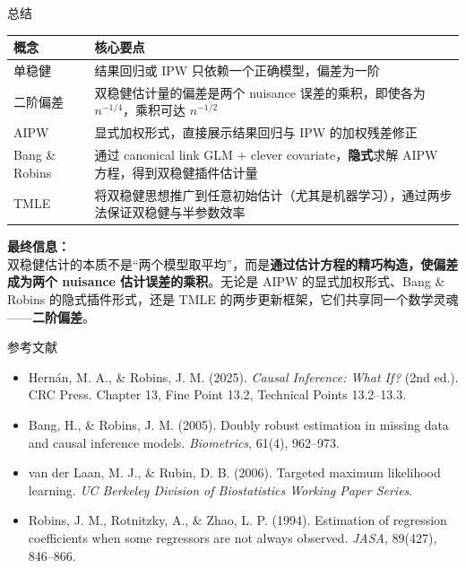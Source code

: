 \documentclass[aspectratio=169,10pt]{beamer}
\begin{document}
	\begin{frame}{总结}
		\begin{center}
			\begin{tabular}{p{3.5cm}p{9cm}}
				\toprule
				\textbf{概念} & \textbf{核心要点} \\
				\midrule
				单稳健 & 结果回归或 IPW 只依赖一个正确模型，偏差为一阶 \\
				二阶偏差 & 双稳健估计量的偏差是两个 nuisance 误差的乘积，即使各为 $n^{-1/4}$，乘积可达 $n^{-1/2}$ \\
				AIPW & 显式加权形式，直接展示结果回归与 IPW 的加权残差修正 \\
				Bang \& Robins & 通过 canonical link GLM + clever covariate，\textbf{隐式}求解 AIPW 方程，得到双稳健插件估计量 \\
				TMLE & 将双稳健思想推广到任意初始估计（尤其是机器学习），通过两步法保证双稳健与半参数效率 \\
				\bottomrule
			\end{tabular}
		\end{center}
		
		\vspace{0.5cm}
		\textbf{最终信息：}\\
		双稳健估计的本质不是“两个模型取平均”，而是\textbf{通过估计方程的精巧构造，使偏差成为两个 nuisance 估计误差的乘积}。无论是 AIPW 的显式加权形式、Bang \& Robins 的隐式插件形式，还是 TMLE 的两步更新框架，它们共享同一个数学灵魂——\textbf{二阶偏差}。
	\end{frame}
	
	\begin{frame}{参考文献}
		\begin{itemize}
			\item Hernán, M. A., \& Robins, J. M. (2025). \textit{Causal Inference: What If?} (2nd ed.). CRC Press. Chapter 13, Fine Point 13.2, Technical Points 13.2--13.3.
			\item Bang, H., \& Robins, J. M. (2005). Doubly robust estimation in missing data and causal inference models. \textit{Biometrics}, 61(4), 962--973.
			\item van der Laan, M. J., \& Rubin, D. B. (2006). Targeted maximum likelihood learning. \textit{UC Berkeley Division of Biostatistics Working Paper Series}.
			\item Robins, J. M., Rotnitzky, A., \& Zhao, L. P. (1994). Estimation of regression coefficients when some regressors are not always observed. \textit{JASA}, 89(427), 846--866.
		\end{itemize}
	\end{frame}
	
\end{document}
